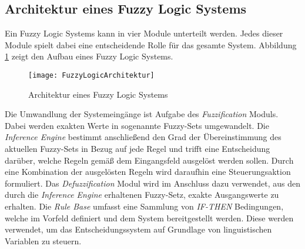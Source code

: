 \subsection{Architektur eines Fuzzy Logic Systems}
Ein Fuzzy Logic Systems kann in vier Module unterteilt werden. Jedes dieser Module spielt dabei eine entscheidende Rolle für das gesamte System. 
Abbildung \ref{fig:FuzzyLogicArchitektur} zeigt den Aufbau eines Fuzzy Logic Systems.\\
\vspace{-1cm}
\begin{center}
    \begin{figure}[h]
     \centering
     \texttt{[image: FuzzyLogicArchitektur]}
     \caption{Architektur eines Fuzzy Logic Systems \cite{FuzzyLogicGeeks}}
     \label{fig:FuzzyLogicArchitektur}
    \end{figure}
   \end{center}
\vspace{-1.7cm}
Die Umwandlung der Systemeingänge ist Aufgabe des \textit{Fuzzification} Moduls. Dabei werden exakten Werte in sogenannte Fuzzy-Sets umgewandelt. Die \textit{Inference Engine} bestimmt anschließend den Grad der Übereinstimmung des aktuellen Fuzzy-Sets in Bezug auf jede Regel und trifft eine Entscheidung darüber, welche Regeln gemäß dem Eingangsfeld ausgelöst werden sollen. Durch eine Kombination der ausgelösten Regeln wird daraufhin eine Steuerungsaktion formuliert. Das \textit{Defuzzification} Modul wird im Anschluss dazu verwendet, aus den durch die \textit{Inference Engine} erhaltenen Fuzzy-Setz, exakte Ausgangswerte zu erhalten.
Die \textit{Rule Base} umfasst eine Sammlung von \glqq\textit{IF-THEN}\grqq{} Bedingungen, welche im Vorfeld definiert und dem System bereitgestellt werden. Diese werden verwendet, um das Entscheidungssystem auf Grundlage von linguistischen Variablen zu steuern. \cite{FuzzyLogicGeeks}\\

